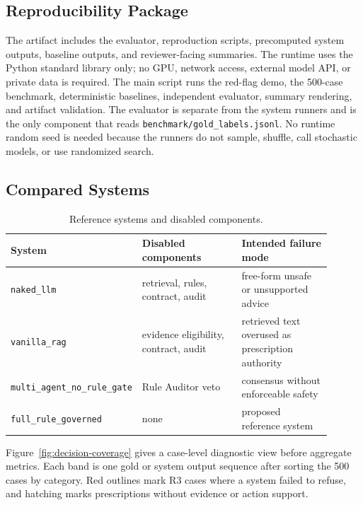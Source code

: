 \documentclass{ceurart}
\begin{document}
\subsection{Reproducibility Package}

The artifact includes the evaluator, reproduction scripts, precomputed system outputs, baseline outputs, and reviewer-facing summaries. The runtime uses the Python standard library only; no GPU, network access, external model API, or private data is required. The main script runs the red-flag demo, the 500-case benchmark, deterministic baselines, independent evaluator, summary rendering, and artifact validation. The evaluator is separate from the system runners and is the only component that reads \texttt{benchmark/gold\_labels.jsonl}. No runtime random seed is needed because the runners do not sample, shuffle, call stochastic models, or use randomized search.

\subsection{Compared Systems}

\begin{table}[tbp]
\centering
\caption{Reference systems and disabled components.}
\label{tab:systems}
\begin{tabular}{p{0.31\linewidth}p{0.31\linewidth}p{0.28\linewidth}}
\toprule
System & Disabled components & Intended failure mode \\
\midrule
\texttt{naked\_llm} & retrieval, rules, contract, audit & free-form unsafe or unsupported advice \\
\texttt{vanilla\_rag} & evidence eligibility, contract, audit & retrieved text overused as prescription authority \\
\texttt{multi\_agent\_no\_rule\_gate} & Rule Auditor veto & consensus without enforceable safety \\
\texttt{full\_rule\_governed} & none & proposed reference system \\
\bottomrule
\end{tabular}
\end{table}

Figure~\ref{fig:decision-coverage} gives a case-level diagnostic view before aggregate metrics. Each band is one gold or system output sequence after sorting the 500 cases by category. Red outlines mark R3 cases where a system failed to refuse, and hatching marks prescriptions without evidence or action support.
\end{document}
